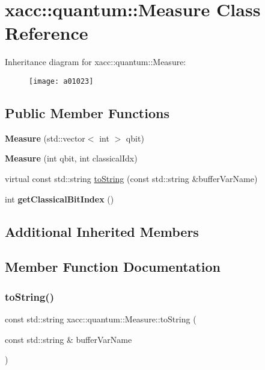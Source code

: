 \hypertarget{a01023}{}\section{xacc\+:\+:quantum\+:\+:Measure Class Reference}
\label{a01023}
Inheritance diagram for xacc\+:\+:quantum\+:\+:Measure\+:\begin{figure}[H]
\begin{center}
\leavevmode
\texttt{[image: a01023]}
\end{center}
\end{figure}
\subsection*{Public Member Functions}
\begin{DoxyCompactItemize}
\item 
\mbox{\label{a01023_afe330a0eea029d842ff9c88a817dcc7d}} 
{\bfseries Measure} (std\+::vector$<$ int $>$ qbit)
\item 
\mbox{\label{a01023_a9b8d9edca8ad2c3fb132780200f17335}} 
{\bfseries Measure} (int qbit, int classical\+Idx)
\item 
virtual const std\+::string \hyperlink{a01023_a1c51a5d68294dcb2ba1a9fbea63a730f}{to\+String} (const std\+::string \&buffer\+Var\+Name)
\item 
\mbox{\label{a01023_a0cb3c94731544042807236ade36fddd0}} 
int {\bfseries get\+Classical\+Bit\+Index} ()
\end{DoxyCompactItemize}
\subsection*{Additional Inherited Members}


\subsection{Member Function Documentation}
\mbox{\label{a01023_a1c51a5d68294dcb2ba1a9fbea63a730f}} 
\subsubsection{\texorpdfstring{to\+String()}{toString()}}
{\footnotesize\ttfamily const std\+::string xacc\+::quantum\+::\+Measure\+::to\+String (\begin{DoxyParamCaption}\item[{const std\+::string \&}]{buffer\+Var\+Name }\end{DoxyParamCaption})\hspace{0.3cm}{\ttfamily [virtual]}}

